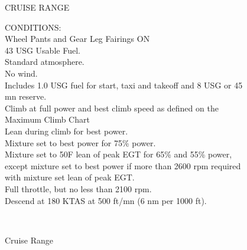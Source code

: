 \begin{figure}[t]
\begin{center}
\begin{perfhdr}CRUISE RANGE\\
\end{perfhdr}

\begin{minipage}{5in}
  \begin{flushleft}
    CONDITIONS:\\
    Wheel Pants and Gear Leg Fairings ON\\
    43 USG Usable Fuel.\\
    Standard atmosphere.\\
    No wind.\\
    Includes 1.0 USG fuel for start, taxi and takeoff and 8 USG or 45 mn reserve.\\
    Climb at full power and best climb speed as defined on the Maximum Climb Chart\\
    Lean during climb for best power.\\
    Mixture set to best power for 75\% power.\\
    Mixture set to 50\textdegree F lean of peak EGT for 65\% and 55\% power, except mixture set to best power if more than 2600 rpm required with mixture set lean of peak EGT.\\
    Full throttle, but no less than 2100 rpm.\\
    Descend at 180 KTAS at 500 ft/mn (6 nm per 1000 ft).\\
    \end{flushleft}
\end{minipage}\\
\vspace{5ex}
\end{center}  %
\caption{Cruise Range}
\label{Cruise-range}
\end{figure}
\clearpage


